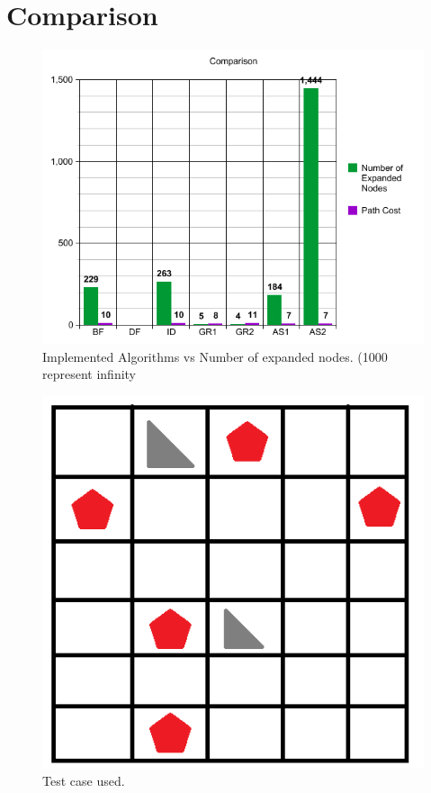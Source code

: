 \section{Comparison}
\begin{figure}[H] 
   	\centering
	\includegraphics[scale=0.6]{images/Graph} 
    \caption{Implemented Algorithms vs Number of expanded nodes. (1000 represent infinity}
    \label{fig:graph} 
\end{figure}

\begin{figure}[H] 
   	\centering
	\includegraphics[scale=0.6]{images/grid} 
    \caption{Test case used.}
    \label{fig:grid} 
\end{figure}

